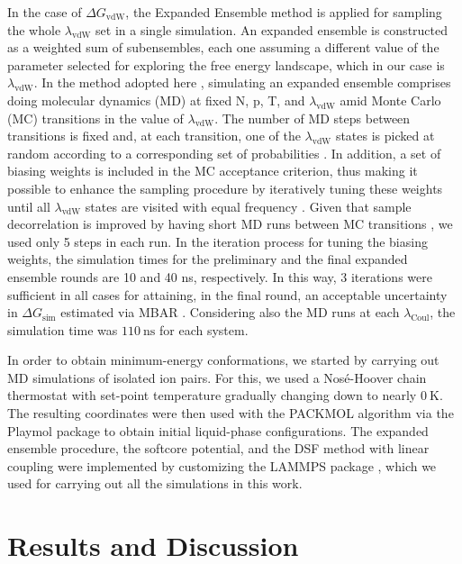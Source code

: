 \documentclass[3p,twocolumn]{elsarticle}
\begin{document}
In the case of $\Delta G_\text{vdW}$, the Expanded Ensemble method \cite{Lyubartsev_1992} is applied for sampling the whole $\lambda_\text{vdW}$ set in a single simulation.
An expanded ensemble is constructed as a weighted sum of subensembles, each one assuming a different value of the parameter selected for exploring the free energy landscape, which in our case is $\lambda_\text{vdW}$.
In the method adopted here \cite{Chodera_2011_2}, simulating an expanded ensemble comprises doing molecular dynamics (MD) at fixed N, p, T, and $\lambda_\text{vdW}$ amid Monte Carlo (MC) transitions in the value of $\lambda_\text{vdW}$.
The number of MD steps between transitions is fixed and, at each transition, one of the $\lambda_\text{vdW}$ states is picked at random according to a corresponding set of probabilities \cite{Chodera_2011_2}.
In addition, a set of biasing weights is included in the MC acceptance criterion, thus making it possible to enhance the sampling procedure by iteratively tuning these weights until all $\lambda_\text{vdW}$ states are visited with equal frequency \cite{Lyubartsev_1992}.
Given that sample decorrelation is improved by having short MD runs between MC transitions \cite{Chodera_2011_2}, we used only 5 steps in each run.
In the iteration process for tuning the biasing weights, the simulation times for the preliminary and the final expanded ensemble rounds are 10 and 40 ns, respectively.
In this way, 3 iterations were sufficient in all cases for attaining, in the final round, an acceptable uncertainty in $\Delta G_\text{sim}$ estimated via MBAR \cite{Shirts_2008, Klimovich_2015}. Considering also the MD runs at each $\lambda_{\text{Coul}}$, the simulation time was $110~\mathrm{ns}$ for each system.

In order to obtain minimum-energy conformations, we started by carrying out MD simulations of isolated ion pairs.
For this, we used a Nos\'{e}-Hoover chain thermostat \cite{Martyna1992} with set-point temperature gradually changing down to nearly $0~\text{K}$.
The resulting coordinates were then used with the PACKMOL algorithm \cite{Mart_nez_2009} via the Playmol package \cite{playmol} to obtain initial liquid-phase configurations.
The expanded ensemble procedure, the softcore potential, and the DSF method  with linear coupling were implemented by customizing the LAMMPS package \cite{Plimpton1995}, which we used for carrying out all the simulations in this work.

\section{Results and Discussion}
\label{sec:results}
\end{document}
